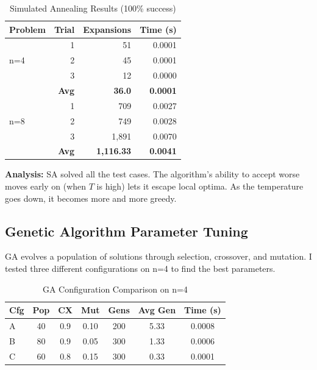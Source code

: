 \documentclass[letterpaper]{article}
\begin{document}
\begin{table}[h]
\centering
\tiny
\begin{tabular}{lrrr}
\toprule
\textbf{Problem} & \textbf{Trial} & \textbf{Expansions} & \textbf{Time (s)} \\
\midrule
\multirow{3}{*}{n=4} & 1 & 51 & 0.0001 \\
& 2 & 45 & 0.0001 \\
& 3 & 12 & 0.0000 \\
\cmidrule{2-4}
& \textbf{Avg} & \textbf{36.0} & \textbf{0.0001} \\
\midrule
\multirow{3}{*}{n=8} & 1 & 709 & 0.0027 \\
& 2 & 749 & 0.0028 \\
& 3 & 1,891 & 0.0070 \\
\cmidrule{2-4}
& \textbf{Avg} & \textbf{1,116.33} & \textbf{0.0041} \\
\bottomrule
\end{tabular}
\caption{Simulated Annealing Results (100\% success)}
\end{table}

\textbf{Analysis:} SA solved all the test cases. The algorithm's ability to accept worse moves early on (when $T$ is high) lets it escape local optima. As the temperature goes down, it becomes more and more greedy.

\subsection{Genetic Algorithm Parameter Tuning}

GA evolves a population of solutions through selection, crossover, and mutation. I tested three different configurations on n=4 to find the best parameters.

\begin{table}[h]
\centering
\tiny
\begin{tabular}{lcccccc}
\toprule
\textbf{Cfg} & \textbf{Pop} & \textbf{CX} & \textbf{Mut} & \textbf{Gens} & \textbf{Avg Gen} & \textbf{Time (s)} \\
\midrule
A & 40 & 0.9 & 0.10 & 200 & 5.33 & 0.0008 \\
B & 80 & 0.9 & 0.05 & 300 & 1.33 & 0.0006 \\
C & 60 & 0.8 & 0.15 & 300 & 0.33 & 0.0001 \\
\bottomrule
\end{tabular}
\caption{GA Configuration Comparison on n=4}
\end{table}
\end{document}
